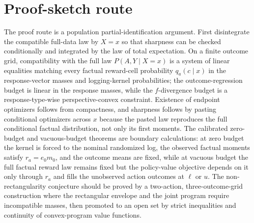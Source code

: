 \documentclass[11pt]{article}
\theoremstyle{definition}
\theoremstyle{plain}
\theoremstyle{remark}
\begin{document}
\section{Proof-sketch route}
The proof route is a population partial-identification argument. First disintegrate the compatible full-data law by $X=x$ so that sharpness can be checked conditionally and integrated by the law of total expectation. On a finite outcome grid, compatibility with the full law $P(A,Y\mid X=x)$ is a system of linear equalities matching every factual reward-cell probability $q_a(c\mid x)$ in the response-vector masses and logging-kernel probabilities; the outcome-regression budget is linear in the response masses, while the $f$-divergence budget is a response-type-wise perspective-convex constraint. Existence of endpoint optimizers follows from compactness, and sharpness follows by pasting conditional optimizers across $x$ because the pasted law reproduces the full conditional factual distribution, not only its first moments. The calibrated zero-budget and vacuous-budget theorems are boundary calculations: at zero budget the kernel is forced to the nominal randomized log, the observed factual moments satisfy $r_a=e_0m_0$, and the outcome means are fixed, while at vacuous budget the full factual reward law remains fixed but the policy-value objective depends on it only through $r_a$ and fills the unobserved action outcomes at $\ell$ or $u$. The non-rectangularity conjecture should be proved by a two-action, three-outcome-grid construction where the rectangular envelope and the joint program require incompatible masses, then promoted to an open set by strict inequalities and continuity of convex-program value functions.
\end{document}
